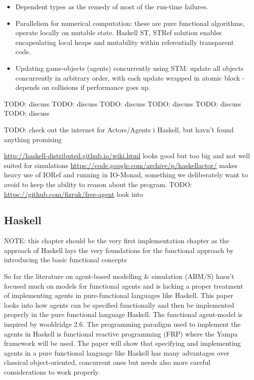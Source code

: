 \begin{itemize}
\item Dependent types as the remedy of most of the run-time failures.
\item Parallelism for numerical computation: these are pure functional algorithms, operate locally on mutable state. Haskell ST, STRef solution enables encapsulating local heaps and mutability within referentially transparent code.
\item Updating game-objects (agents) concurrently using STM: update all objects concurrently in arbitrary order, with each update wrapped in atomic block - depends on collisions if performance goes up.
\end{itemize}

TODO: discuss \cite{schneider_towards_2012}
TODO: discuss \cite{vendrov_frabjous:_2014}
TODO: discuss \cite{sulzmann_specifying_2007}
TODO: discuss \cite{jankovic_functional_2007}
TODO: discuss \cite{de_jong_suitability_2014}
TODO: discuss \cite{sorokin_aivika_2015}

TODO: check out the internet for Actors/Agents i Haskell, but havn't found anything promising

\url{http://haskell-distributed.github.io/wiki.html} looks good but too big and not well suited for simulations
\url{https://code.google.com/archive/p/haskellactor/} makes heavy use of IORef and running in IO-Monad, something we deliberately want to avoid to keep the ability to reason about the program.
TODO: \url{https://github.com/fizruk/free-agent} look into


\subsection{Haskell} 
NOTE: this chapter should be the very first implementation chapter as the approach of Haskell lays the very foundations for the functional approach by introducing the basic functional concepts

So far the literature on agent-based modelling \& simulation (ABM/S) hasn't focused much on models for functional agents and is lacking a proper treatment of implementing agents in pure-functional languages like Haskell. This paper looks into how agents can be specified functionally and then be implemented properly in the pure functional language Haskell. The functional agent-model is inspired by wooldridge 2.6. The programming paradigm used to implement the agents in Haskell is functional reactive programming (FRP) where the Yampa framework will be used. The paper will show that specifying and implementing agents in a pure functional language like Haskell has many advantages over classical object-oriented, concurrent ones but needs also more careful considerations to work properly.

